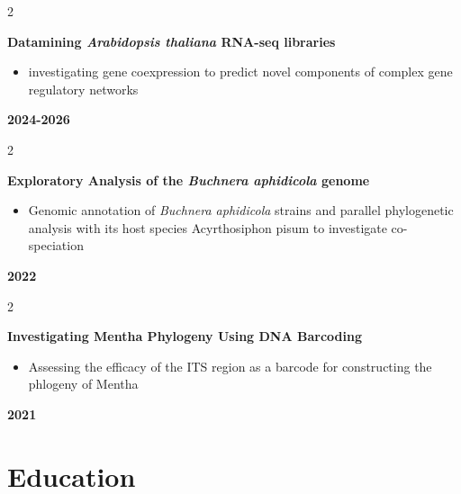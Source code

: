 \documentclass[10pt, letterpaper]{article}
\newenvironment{highlights}{
    \begin{itemize}[
        topsep=0.10 cm,
        parsep=0.10 cm,
        partopsep=0pt,
        itemsep=0pt,
        leftmargin=0.4 cm + 0pt
    ]
}{
    \end{itemize}
} %
\newenvironment{twocolentry}[2][]{
    \onecolentry
    \def\secondColumn{#2}
    \setcolumnwidth{\fill, 2.05 cm}
    \begin{paracol}{2}
}{
    \switchcolumn \raggedleft \secondColumn
    \end{paracol}
    \endonecolentry
} %
\begin{document}
        \vspace{0.2 cm}

        \begin{twocolentry}{
            {\textbf{2024-2026}}
        }
            {\textbf{Datamining \textit{Arabidopsis thaliana} RNA-seq libraries}}
            \begin{highlights}
            \item investigating gene coexpression to predict novel components of complex gene regulatory networks  
            \end{highlights}
        \end{twocolentry}

        \vspace{0.2 cm}

        \begin{twocolentry}{
            {\textbf{2022}}
        }
            {\textbf{Exploratory Analysis of the \textit{Buchnera aphidicola} genome}}
            \begin{highlights}
                \item Genomic annotation of \textit{Buchnera aphidicola} strains and parallel phylogenetic analysis with its host species Acyrthosiphon pisum to investigate co-speciation
            \end{highlights}
        \end{twocolentry}

\vspace{0.2 cm}

        \begin{twocolentry}{
            {\textbf{2021}}
        }
            {\textbf{Investigating Mentha Phylogeny Using DNA Barcoding}}
            \begin{highlights}
                \item Assessing the efficacy of the ITS region as a barcode for constructing the phlogeny of Mentha
            \end{highlights}
        \end{twocolentry}

\vspace{0.1 cm}

\section{Education}
\end{document}
